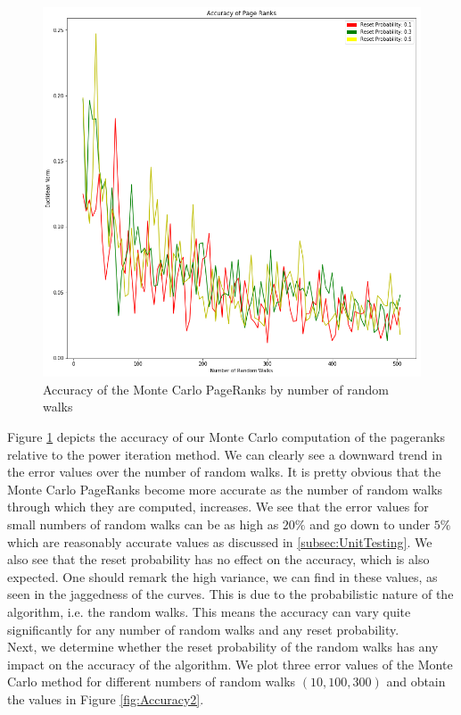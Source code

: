 \documentclass[twocolumn]{article}
\theoremstyle{definition}
\theoremstyle{theorem}
\begin{document}
\begin{figure}
\includegraphics[scale=0.3]{Accuracy1}
\caption{Accuracy of the Monte Carlo PageRanks by number of random walks}
\label{fig:Accuracy1}
\end{figure}

\noindent Figure \ref{fig:Accuracy1} depicts the accuracy of our Monte Carlo computation of the pageranks relative to the power iteration method. We can clearly see a downward trend in the error values over the number of random walks. It is pretty obvious that the Monte Carlo PageRanks become more accurate as the number of random walks through which they are computed, increases. We see that the error values for small numbers of random walks can be as high as $20\%$ and go down to under $5\%$ which are reasonably accurate values as discussed in \ref{subsec:UnitTesting}. We also see that the reset probability has no effect on the accuracy, which is also expected. One should remark the high variance, we can find in these values, as seen in the jaggedness of the curves. This is due to the probabilistic nature of the algorithm, i.e. the random walks. This means the accuracy can vary quite significantly for any number of random walks and any reset probability. \vspace{1em}\\

\noindent Next, we determine whether the reset probability of the random walks has any impact on the accuracy of the algorithm. We plot three error values of the Monte Carlo method for different numbers of random walks $(10, 100, 300)$ and obtain the values in Figure \ref{fig:Accuracy2}. \vspace{1em}\\ 
\end{document}
